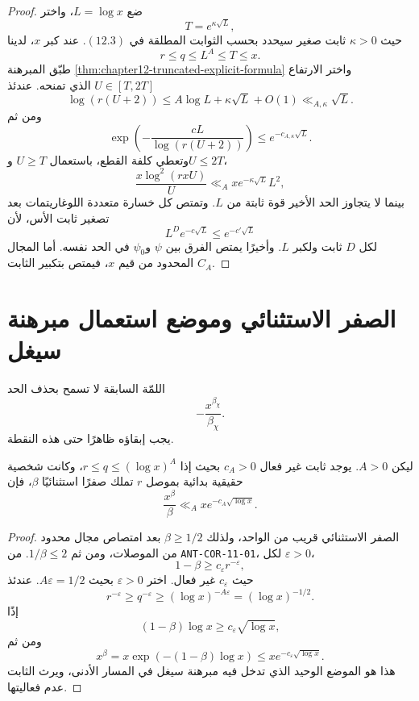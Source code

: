 \begin{proof}
ضع \(L=\log x\)، واختر
\[
T=e^{\kappa\sqrt L},
\]
حيث \(\kappa>0\) ثابت صغير سيحدد بحسب الثوابت المطلقة في
\((12.3)\). عند كبر \(x\)، لدينا
\[
r\le q\le L^A\le T\le x.
\]
طبّق المبرهنة \ref{thm:chapter12-truncated-explicit-formula} واختر الارتفاع
\(U\in[T,2T]\) الذي تمنحه. عندئذ
\[
\log(r(U+2))
\le A\log L+\kappa\sqrt L+O(1)
\ll_{A,\kappa}\sqrt L.
\]
ومن ثم
\[
\exp\!\left(-\frac{cL}{\log(r(U+2))}\right)
\le e^{-c_{A,\kappa}\sqrt L}.
\]
وتعطي كلفة القطع، باستعمال \(U\ge T\) و\(U\le2T\)،
\[
\frac{x\log^2(rxU)}{U}
\ll_A
xe^{-\kappa\sqrt L}L^2,
\]
بينما لا يتجاوز الحد الأخير قوة ثابتة من \(L\). وتمتص كل خسارة متعددة
اللوغاريتمات بعد تصغير ثابت الأس، لأن
\[
L^D e^{-c\sqrt L}\le e^{-c'\sqrt L}
\]
لكل \(D\) ثابت ولكبر \(L\). وأخيرًا يمتص الفرق بين \(\psi\) و\(\psi_0\)
في الحد نفسه. أما المجال المحدود من قيم \(x\)، فيمتص بتكبير الثابت
\(C_A\).
\end{proof}

\section{الصفر الاستثنائي وموضع استعمال مبرهنة سيغل}

اللمّة السابقة لا تسمح بحذف الحد
\[
-\frac{x^{\beta_\chi}}{\beta_\chi}.
\]
يجب إبقاؤه ظاهرًا حتى هذه النقطة.

\begin{lemma}
\label{lem:chapter12-exceptional-zero-absorption}
\provedhere
ليكن \(A>0\). يوجد ثابت غير فعال \(c_A>0\) بحيث إذا
\(r\le q\le(\log x)^A\)، وكانت شخصية حقيقية بدائية بموصل \(r\) تملك
صفرًا استثنائيًا \(\beta\)، فإن
\[
\frac{x^\beta}{\beta}
\ll_A
xe^{-c_A\sqrt{\log x}}.
\tag{12.5}
\]
\end{lemma}

\begin{proof}
الصفر الاستثنائي قريب من الواحد، ولذلك \(\beta\ge1/2\) بعد امتصاص مجال
محدود من الموصلات، ومن ثم \(1/\beta\le2\). من
\textenglish{\texttt{ANT-COR-11-01}}، لكل \(\varepsilon>0\)،
\[
1-\beta\ge c_\varepsilon r^{-\varepsilon},
\]
حيث \(c_\varepsilon\) غير فعال. اختر \(\varepsilon>0\) بحيث
\(A\varepsilon=1/2\). عندئذ
\[
r^{-\varepsilon}
\ge q^{-\varepsilon}
\ge(\log x)^{-A\varepsilon}
=(\log x)^{-1/2}.
\]
إذًا
\[
(1-\beta)\log x
\ge c_\varepsilon\sqrt{\log x},
\]
ومن ثم
\[
x^\beta
=x\exp(-(1-\beta)\log x)
\le xe^{-c_\varepsilon\sqrt{\log x}}.
\]
هذا هو الموضع الوحيد الذي تدخل فيه مبرهنة سيغل في المسار الأدنى، ويرث
الثابت عدم فعاليتها.
\end{proof}

